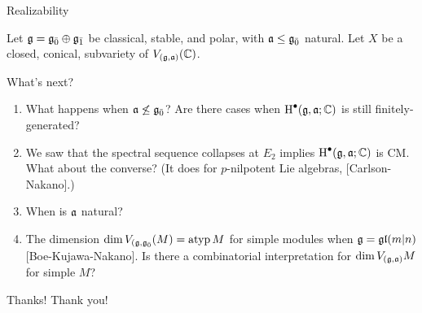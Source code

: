 \documentclass{beamer}
\begin{document}
\begin{frame}{Realizability}
  \pause
  \begin{theorem}
    Let $\mathfrak{g} = {\mathfrak{g}}_{\bar{0}} \oplus {\mathfrak{g}}_{\bar{1}}$ be classical, stable, and polar, with $\mathfrak{a} \leq {\mathfrak{g}}_{\bar{0}}$ natural. Let $X$ be a closed, conical, subvariety of $V_{(\mathfrak{g},\mathfrak{a})}(\mathbb{C})$. 
  \end{theorem}
\end{frame}

\begin{frame}{What's next?}
  \begin{enumerate}
  \pause\item What happens when $\mathfrak{a} \not\leq {\mathfrak{g}}_{\bar{0}}$? Are there cases when $\operatorname{H}^\bullet(\mathfrak{g},\mathfrak{a};\mathbb{C})$ is still finitely-generated?
  \pause\item We saw that the spectral sequence collapses at $E_2$ implies $\operatorname{H}^\bullet(\mathfrak{g},\mathfrak{a};\mathbb{C})$ is CM. What about the converse? (It does for $p$-nilpotent Lie algebras, [Carlson-Nakano].)
  \pause\item When is $\mathfrak{a}$ natural?
  \pause\item The dimension $\dim V_{(\mathfrak{g},{\mathfrak{g}}_{\bar{0}}}(M) = \operatorname{atyp} M$ for simple modules when $\mathfrak{g} = \mathfrak{gl}(m|n)$ [Boe-Kujawa-Nakano]. Is there a combinatorial interpretation for $\dim V_{(\mathfrak{g},\mathfrak{a})} M$ for simple $M$?
  \end{enumerate}
\end{frame}

\begin{frame}{Thanks!}
  \centering
  \large Thank you!
\end{frame}
\end{document}
